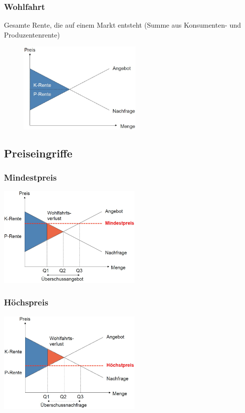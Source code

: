 \subsubsection{Wohlfahrt}
Gesamte Rente, die auf einem Markt entsteht (Summe
aus Konsumenten- und Produzentenrente)
\begin{figure}[h]
	\centering
	\includegraphics[width=6cm]{images/wohlfahrt.jpg}
\end{figure}
\subsection{Preiseingriffe}
\begin{multicols}{2}
	\subsubsection{Mindestpreis}
	\includegraphics[width=7cm]{images/mindestpreis.jpg}
	\subsubsection{Höchspreis}
	\includegraphics[width=7cm]{images/hochstpreis.jpg}
\end{multicols}

